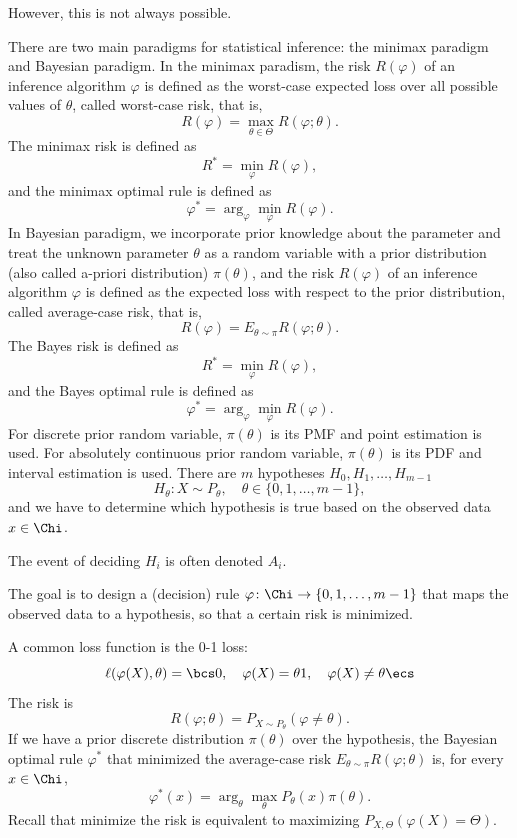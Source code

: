 \documentclass[a4paper,12pt]{report}
\begin{document}
However, this is not always possible.

There are two main paradigms for statistical inference: the minimax paradigm and Bayesian paradigm.
In the minimax paradism, the risk $R(\varphi)$ of an inference algorithm $\varphi$ is defined as the worst-case expected loss over all possible values of $\theta$, called worst-case risk, that is,
\[R(\varphi)=\max_{\theta\in\Theta}R(\varphi;\theta).\]
The minimax risk is defined as
\[R^*=\min_{\varphi}R(\varphi),\]
and the minimax optimal rule is defined as
\[\varphi^*=\arg_{\varphi}\min_{\varphi}R(\varphi).\]
In Bayesian paradigm, we incorporate prior knowledge about the parameter and treat the unknown parameter $\theta$ as a random variable with a prior distribution (also called a-priori distribution) $\pi(\theta)$, and the risk $R(\varphi)$ of an inference algorithm $\varphi$ is defined as the expected loss with respect to the prior distribution, called average-case risk, that is,
\[R(\varphi)=E_{\theta\sim\pi}R(\varphi;\theta).\]
The Bayes risk is defined as
\[R^*=\min_{\varphi}R(\varphi),\]
and the Bayes optimal rule is defined as
\[\varphi^*=\arg_{\varphi}\min_{\varphi}R(\varphi).\]
For discrete prior random variable, $\pi(\theta)$ is its PMF and point estimation is used. For absolutely continuous prior random variable, $\pi(\theta)$ is its PDF and interval estimation is used.
There are $m$ hypotheses $H_0,H_1,\ldots,H_{m-1}$
\[H_{\theta}\colon X\sim P_{\theta},\quad\theta\in\{0,1,\ldots,m-1\},\]
and we have to determine which hypothesis is true based on the observed data $x\in\Chi$.

The event of deciding $H_i$ is often denoted $A_i$.

The goal is to design a (decision) rule $\varphi\colon\Chi\to\{0,1,\ldots,m-1\}$ that maps the observed data to a hypothesis, so that a certain risk is minimized.

A common loss function is the 0-1 loss:
\[\ell(\varphi(X),\theta)=\bcs0,\quad\varphi(X)=\theta\\1,\quad\varphi(X)\ne\theta\ecs\]
The risk is
\[R(\varphi;\theta)=P_{X\sim P_{\theta}}(\varphi\ne\theta).\]
If we have a prior discrete distribution $\pi(\theta)$ over the hypothesis, the Bayesian optimal rule $\varphi^*$ that minimized the average-case risk $E_{\theta\sim\pi}R(\varphi;\theta)$ is, for every $x\in\Chi$,
\[\varphi^*(x)=\arg_{\theta}\max_{\theta}P_{\theta}(x)\pi(\theta).\]
\bpr
Recall that minimize the risk is equivalent to maximizing $P_{X,\Theta}(\varphi(X)=\Theta)$.
\end{document}
